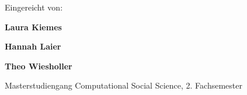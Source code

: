 \begin{titlepage}

\vspace{2.25cm}

\begin{flushleft}
\small
Eingereicht von:

\vspace{0.15cm}

\textbf{Laura Kiemes}
\ifx\LauraAddress\empty
\else
\\
\LauraAddress
\fi

\vspace{0.15cm}

\textbf{Hannah Laier}
\ifx\HannahAddress\empty
\else
\\
\HannahAddress
\fi

\vspace{0.15cm}

\textbf{Theo Wiesholler}
\ifx\TheoAddress\empty
\else
\\
\TheoAddress
\fi
\vspace{0.15cm}

Masterstudiengang Computational Social Science, 2. Fachsemester

\end{flushleft}

\end{titlepage}

\clearpage
